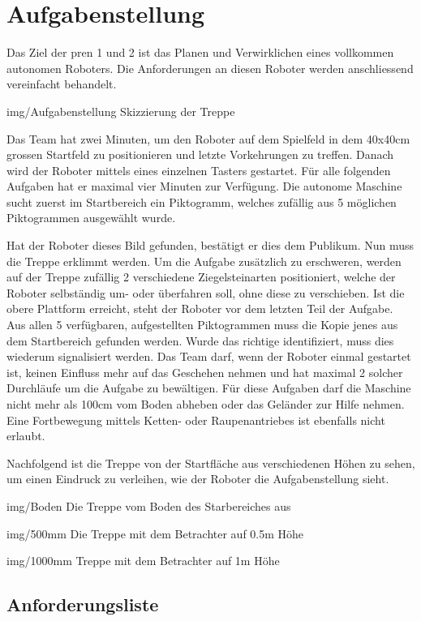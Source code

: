 \section{Aufgabenstellung}

Das Ziel der \acrfull{pren} 1 und 2 ist das Planen und Verwirklichen eines vollkommen autonomen Roboters. Die Anforderungen an diesen Roboter werden anschliessend vereinfacht behandelt. 

\image
 {img/Aufgabenstellung}
 {Skizzierung der Treppe}
 
Das Team hat zwei Minuten, um den Roboter auf dem Spielfeld in dem 40x40cm grossen 
Startfeld zu positionieren und letzte Vorkehrungen zu treffen. 
Danach wird der Roboter mittels eines einzelnen Tasters gestartet. 
Für alle folgenden Aufgaben hat er maximal vier Minuten zur Verfügung. 
Die autonome Maschine sucht zuerst im Startbereich ein Piktogramm, welches zufällig aus 5 möglichen Piktogrammen ausgewählt wurde. 

Hat der Roboter dieses Bild gefunden, bestätigt er dies dem Publikum. 
Nun muss die Treppe erklimmt werden. Um die Aufgabe zusätzlich zu erschweren,
werden auf der Treppe zufällig 2 verschiedene Ziegelsteinarten positioniert, welche der Roboter selbständig um- oder überfahren soll, ohne diese zu verschieben.
Ist die obere Plattform erreicht, steht der Roboter vor dem letzten Teil der Aufgabe. 
Aus allen 5 verfügbaren, aufgestellten Piktogrammen muss die Kopie jenes aus dem 
Startbereich gefunden werden. Wurde das richtige identifiziert, 
muss dies wiederum signalisiert werden. Das Team darf,
wenn der Roboter einmal gestartet ist, 
keinen Einfluss mehr auf das Geschehen nehmen und hat maximal 2 solcher Durchläufe 
um die Aufgabe zu bewältigen. Für diese Aufgaben darf die Maschine nicht mehr 
als 100cm vom Boden abheben oder das Geländer zur Hilfe nehmen. 
Eine Fortbewegung mittels Ketten- oder Raupenantriebes ist ebenfalls nicht erlaubt.

Nachfolgend ist die Treppe von der Startfläche aus verschiedenen Höhen zu sehen, um einen Eindruck zu verleihen, wie der Roboter die Aufgabenstellung sieht.

\image
  {img/Boden}
  {Die Treppe vom Boden des Starbereiches aus}
 
\image
 {img/500mm}
 {Die Treppe mit dem Betrachter auf 0.5m Höhe}
 
\image
 {img/1000mm}
 {Treppe mit dem Betrachter auf 1m Höhe}

\subsection{Anforderungsliste}
\label{sec:anforderungsliste}

